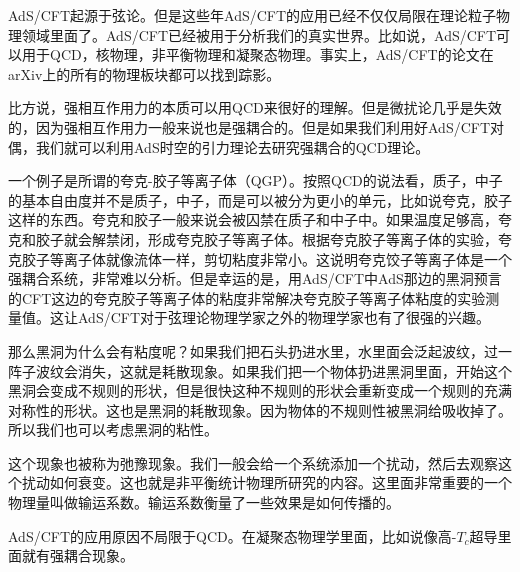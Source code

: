 
AdS/CFT起源于弦论。但是这些年AdS/CFT的应用已经不仅仅局限在理论粒子物理领域里面了。AdS/CFT已经被用于分析我们的真实世界。比如说，AdS/CFT可以用于QCD，核物理，非平衡物理和凝聚态物理。事实上，AdS/CFT的论文在arXiv上的所有的物理板块都可以找到踪影。

比方说，强相互作用力的本质可以用QCD来很好的理解。但是微扰论几乎是失效的，因为强相互作用力一般来说也是强耦合的。但是如果我们利用好AdS/CFT对偶，我们就可以利用AdS时空的引力理论去研究强耦合的QCD理论。

一个例子是所谓的夸克-胶子等离子体（QGP）。按照QCD的说法看，质子，中子的基本自由度并不是质子，中子，而是可以被分为更小的单元，比如说夸克，胶子这样的东西。夸克和胶子一般来说会被囚禁在质子和中子中。如果温度足够高，夸克和胶子就会解禁闭，形成夸克胶子等离子体。根据夸克胶子等离子体的实验，夸克胶子等离子体就像流体一样，剪切粘度非常小。这说明夸克饺子等离子体是一个强耦合系统，非常难以分析。但是幸运的是，用AdS/CFT中AdS那边的黑洞预言的CFT这边的夸克胶子等离子体的粘度非常解决夸克胶子等离子体粘度的实验测量值。这让AdS/CFT对于弦理论物理学家之外的物理学家也有了很强的兴趣。

那么黑洞为什么会有粘度呢？如果我们把石头扔进水里，水里面会泛起波纹，过一阵子波纹会消失，这就是耗散现象。如果我们把一个物体扔进黑洞里面，开始这个黑洞会变成不规则的形状，但是很快这种不规则的形状会重新变成一个规则的充满对称性的形状。这也是黑洞的耗散现象。因为物体的不规则性被黑洞给吸收掉了。所以我们也可以考虑黑洞的粘性。

这个现象也被称为弛豫现象。我们一般会给一个系统添加一个扰动，然后去观察这个扰动如何衰变。这也就是非平衡统计物理所研究的内容。这里面非常重要的一个物理量叫做输运系数。输运系数衡量了一些效果是如何传播的。

AdS/CFT的应用原因不局限于QCD。在凝聚态物理学里面，比如说像高-$T_c$超导里面就有强耦合现象。